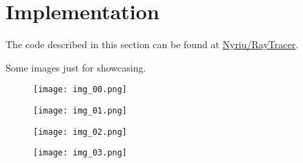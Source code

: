 
\section{Implementation}
The code described in this section can be found at
\href{https://github.com/Nyriu/RayTracer}{Nyriu/RayTracer}.

Some images just for showcasing.

\begin{figure}[!htb]
  \centering
  \texttt{[image: img\_00.png]}
\end{figure}

\begin{figure}[!htb]
  \centering
  \texttt{[image: img\_01.png]}
\end{figure}

\begin{figure}[!htb]
  \centering
  \texttt{[image: img\_02.png]}
\end{figure}

\begin{figure}[!htb]
  \centering
  \texttt{[image: img\_03.png]}
\end{figure}


